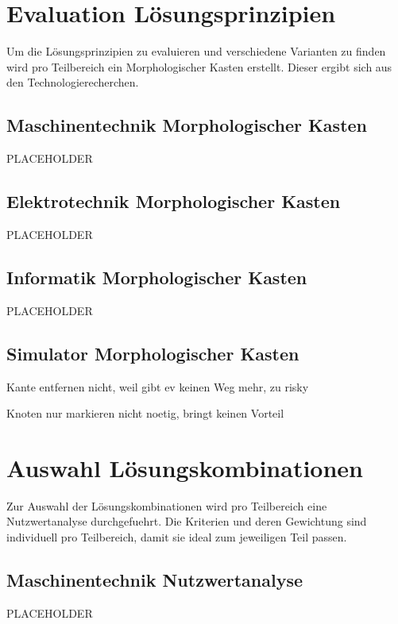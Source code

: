 \section{Evaluation Lösungsprinzipien}

Um die Lösungsprinzipien zu evaluieren und verschiedene Varianten zu finden wird pro Teilbereich ein Morphologischer Kasten erstellt. Dieser ergibt sich aus den Technologierecherchen.

\subsection{Maschinentechnik Morphologischer Kasten}

PLACEHOLDER

\subsection{Elektrotechnik Morphologischer Kasten}

PLACEHOLDER

\subsection{Informatik Morphologischer Kasten}

PLACEHOLDER

\subsection{Simulator Morphologischer Kasten}

Kante entfernen nicht, weil gibt ev keinen Weg mehr, zu risky

Knoten nur markieren nicht noetig, bringt keinen Vorteil


\newpage
\section{Auswahl Lösungskombinationen}

Zur Auswahl der Lösungskombinationen wird pro Teilbereich eine Nutzwertanalyse durchgefuehrt. Die Kriterien und deren Gewichtung sind individuell pro Teilbereich, damit sie ideal zum jeweiligen Teil passen.

\subsection{Maschinentechnik Nutzwertanalyse}

PLACEHOLDER

